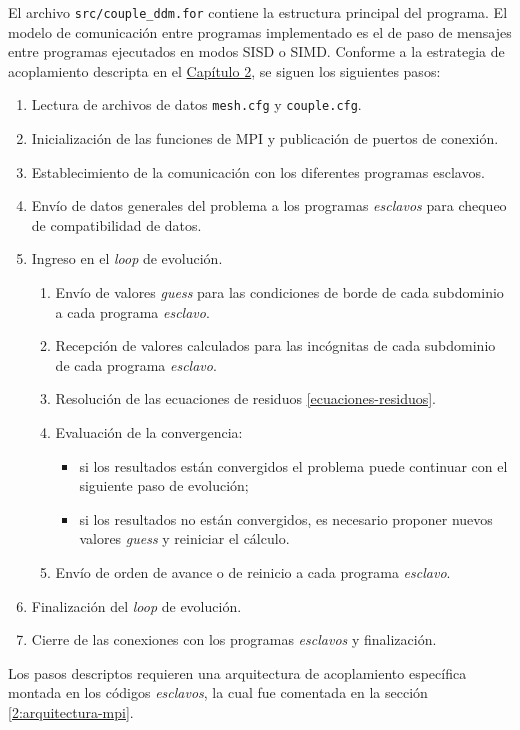 El archivo \texttt{src/couple\_ddm.for} contiene la estructura principal del programa.
El modelo de comunicación entre programas implementado es el de paso de mensajes entre programas ejecutados en modos SISD o SIMD.
Conforme a la estrategia de acoplamiento descripta en el \hyperlink{chapter.2}{Capítulo 2}, se siguen los siguientes pasos:
\begin{enumerate}
\item Lectura de archivos de datos \texttt{mesh.cfg} y \texttt{couple.cfg}.
\item Inicialización de las funciones de MPI y publicación de puertos de conexión.
\item Establecimiento de la comunicación con los diferentes programas esclavos.
\item Envío de datos generales del problema a los programas \textit{esclavos} para chequeo de compatibilidad de datos.
\item Ingreso en el \textit{loop} de evolución.
\begin{enumerate}
\item Envío de valores \textit{guess} para las condiciones de borde de cada subdominio a cada programa \textit{esclavo}.
\item Recepción de valores calculados para las incógnitas de cada subdominio de cada programa \textit{esclavo}.
\item Resolución de las ecuaciones de residuos \ref{ecuaciones-residuos}.
\item Evaluación de la convergencia:
\begin{itemize}
\item si los resultados están convergidos el problema puede continuar con el siguiente paso de evolución;
\item si los resultados no están convergidos, es necesario proponer nuevos valores \textit{guess} y reiniciar el cálculo.
\end{itemize}
\item Envío de orden de avance o de reinicio a cada programa \textit{esclavo}.
\end{enumerate}
\item Finalización del \textit{loop} de evolución.
\item Cierre de las conexiones con los programas \textit{esclavos} y finalización.
\end{enumerate}
Los pasos descriptos requieren una arquitectura de acoplamiento específica montada en los códigos \textit{esclavos}, la cual fue comentada en la sección \ref{2:arquitectura-mpi}.

